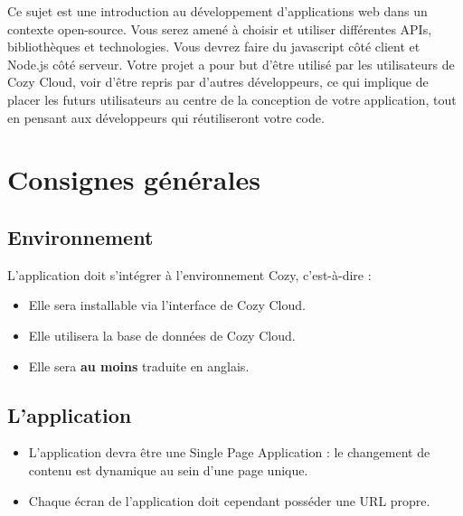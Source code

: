 \documentclass{42-fr}
\begin{document}
	Ce sujet est une introduction au d\'eveloppement d'applications web dans un contexte
	open-source. Vous serez amen\'e \`a choisir et utiliser diff\'erentes APIs,
	biblioth\`eques et technologies. Vous devrez faire du javascript c\^ot\'e
	client et Node.js c\^ot\'e serveur. Votre projet a pour but d'\^etre utilis\'e
	par les utilisateurs de Cozy Cloud, voir d'\^etre repris par d'autres
	d\'eveloppeurs, ce qui implique de placer les futurs utilisateurs au centre
	de la conception de votre application, tout en pensant aux d\'eveloppeurs qui
	r\'eutiliseront votre code.


\chapter{Consignes g\'en\'erales}


    \section{Environnement}
        L'application doit s'int\'egrer \`a l'environnement Cozy, c'est-\`a-dire :

        \begin{itemize}\itemsep1pt
            \item Elle sera installable via l'interface de Cozy Cloud.
            \item Elle utilisera la base de donn\'ees de Cozy Cloud.
            \item Elle sera \textbf{au moins} traduite en anglais.
        \end{itemize}

    \section{L'application}
        \begin{itemize}\itemsep1pt
            \item L'application devra \^etre une Single Page Application :
				le changement de contenu est dynamique au sein d'une page unique.
            \item Chaque \'ecran de l'application doit cependant poss\'eder une URL propre.
        \end{itemize}
\end{document}
